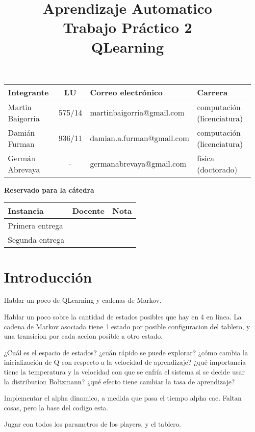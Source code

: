 \documentclass[10pt,a4paper]{article}
\title{Aprendizaje Automatico \\ Trabajo Práctico 2 \\ QLearning }
\begin{document}

\maketitle

\bigskip

\begin{table}[h]
\centering
\begin{tabular}{|l l l l|}
\hline
Integrante       & \multicolumn{1}{c}{LU}     & Correo electrónico       	& Carrera \\ \hline
Martin Baigorria & \multicolumn{1}{c}{575/14} & martinbaigorria@gmail.com & computación (licenciatura) \\ 
Damián Furman & \multicolumn{1}{c}{936/11}& damian.a.furman@gmail.com & computación (licenciatura)\\
Germán Abrevaya & \multicolumn{1}{c}{-} & germanabrevaya@gmail.com & física (doctorado)\\ \hline
\end{tabular}
\end{table}

\vfill

\begin{center}
\textbf{Reservado para la cátedra}
\end{center}
\begin{table}[h]
\centering
\begin{tabular}{|l|l|l|}
\hline
Instancia       & Docente & Nota \\ \hline
Primera entrega &         &      \\ \hline
Segunda entrega &         &      \\ \hline
\end{tabular}
\end{table}

\newpage
\tableofcontents
\newpage


\section{Introducción}

Hablar un poco de QLearning y cadenas de Markov.

Hablar un poco sobre la cantidad de estados posibles que hay en 4 en linea. La cadena de Markov asociada tiene 1 estado por posible configuracion del tablero, y una transicion por cada accion posible a otro estado.

¿Cuál es el espacio de estados?
¿cuán rápido se puede explorar?
¿cómo cambia la inicialización de Q con respecto a la velocidad de aprendizaje?
¿qué importancia tiene la temperatura y la velocidad con que se enfría el sistema si se decide usar la distribution Boltzmann?
¿qué efecto tiene cambiar la tasa de aprendizaje?


Implementar el alpha dinamico, a medida que pasa el tiempo alpha cae. Faltan cosas, pero la base del codigo esta.

Jugar con todos los parametros de los players, y el tablero.
\end{document}
